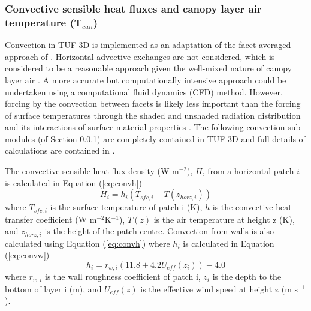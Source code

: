 \documentclass[final,3p,times,authoryear]{elsarticle}
\begin{document}
\subsubsection{Convective sensible heat fluxes and canopy layer air temperature (T$_{can}$)}\label{sec:convection} 
Convection in TUF-3D is implemented as an adaptation of the facet-averaged approach of \cite{Masson2000}. Horizontal advective exchanges are not considered, which is considered to be a reasonable approach given the well-mixed nature of canopy layer air \citep{Krayenhoff2007}. A more accurate but computationally intensive approach could be undertaken using a computational fluid dynamics (CFD) method. However, forcing by the convection between facets is likely less important than the forcing of surface temperatures through the shaded and unshaded radiation distribution and its interactions of surface material properties \citep{Krayenhoff2007}. The following convection sub-modules (of Section \ref{sec:convection}) are completely contained in TUF-3D and full details of calculations are contained in \cite{Krayenhoff2007}.

The convective sensible heat flux density (W m$^{-2}$), $H$, from a horizontal patch $i$ is calculated in Equation (\ref{eq:convh})
\begin{equation} 
H_{i} = h_{i} (T_{sfc,i}-T(z_{horz,i}))
\label{eq:convh} \end{equation} 
where $T_{sfc,i}$ is the surface temperature of patch i (K),
$h$ is the convective heat transfer coefficient (W m$^{-2}$K$^{-1}$), 
$T(z)$ is the air temperature at height z (K), and 
$z_{horz,i}$ is the height of the patch centre. Convection from walls is also calculated using Equation (\ref{eq:convh}) where $h_{i}$ is calculated in Equation (\ref{eq:convw})
\begin{equation} 
h_{i} = r_{w,i}(11.8+4.2 U_{eff}(z_{i}))-4.0
\label{eq:convw} \end{equation} 
where 
$r_{w,i}$ is the wall roughness coefficient of patch i,
$z_{i}$ is the depth to the bottom of layer i (m), and
$U_{eff}(z)$ is the effective wind speed at height z (m s$^{-1}$).


\end{document}
